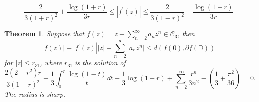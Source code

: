 \documentclass[10pt,a4paper]{amsart}
\newtheorem{theorem}{Theorem}
\begin{document}
\begin{equation}
\frac{2}{3(1+r)^2}+ \frac{\log(1+r)}{3r}
\le |f^{'}(z)| \le
\frac{2}{3(1-r)^2}- \frac{\log(1-r)}{3r}
\label{distortion3}
\end{equation}

\begin{theorem}\label{th2}
Suppose that $f(z)=z + \sum_{n=2}^{\infty} a_n z^n \in \mathcal{C}_3$, then
\begin{equation}\label{2.3.1}
|f(z)| + |f^{'}(z)||z| + \sum_{n=2}^{\infty} |a_n z^n| \le d( f(0), \partial{f(\mathbb{D})})
\end{equation}
for $|z| \le r_{31}$, where $r_{31}$ is the solution of
\begin{equation*}
\frac{2 (2-r^2) r}{3 (1-r)^2}-\frac{1}{3} \int_{0}^{r} \frac{\log(1-t)}{t} dt-\frac{1}{3} \log(1-r)+ \sum_{n=2}^{\infty} \frac{r^n}{3 n^2}-\left(\frac{1}{3}+\frac{\pi ^2}{36}\right)=0.
\end{equation*}
The radius is sharp.
\end{theorem}
\end{document}
